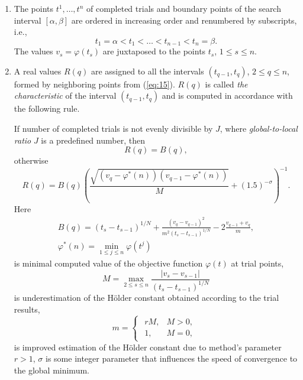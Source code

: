 \documentclass[]{interact}
\theoremstyle{plain}%
\theoremstyle{definition}
\theoremstyle{remark}
\begin{document}
\begin{enumerate}
\item 
The points $t^1, \dots, t^n$ of completed trials and boundary points of the search interval $[\alpha, \beta]$ are ordered in increasing order and renumbered by subscripts, i.e.,
\begin{equation}\label{eq:15}
t_1 = \alpha < t_1 < \dots < t_{n-1} < t_n = \beta.
\end{equation}
The values $v_s = \varphi(t_s)$ are juxtaposed to the points  $t_s$, $1 \leq s \leq n$.
\item 
A real values $R(q)$ are assigned to all the intervals $(t_{q-1}, t_q)$, $2 \leq q \leq n$, formed by neighboring points from (\ref{eq:15}). $R(q)$ is called \textit{the characteristic} of the interval $(t_{q-1}, t_q)$ and is computed in accordance with the following rule.

\textcolor[rgb]{1,0,0}{If number of completed trials is not evenly divisible by $J$, where \textit{global-to-local ratio} $J$ is a predefined number, then }
\begin{equation}\label{eq:16}
R(q) = B(q),
\end{equation}
otherwise
\begin{equation}\label{eq:17}
R(q) = B(q)\left( \frac {\sqrt{(v_q - \varphi^*(n))(v_{q-1} - \varphi^*(n))}}{M} +(1.5)^{-\sigma}\right)^{-1}.
\end{equation}
Here
\begin{gather}\label{eq:18}
B(q) = (t_s - t_{s-1})^{1/N} + \frac{(v_q - v_{q-1})^2} {m^2 (t_s - t_{s-1})^{1/N}} -2\frac{v_{q-1} + v_q}{m},\\
\varphi^*(n) = \min_{1\leq j \leq n} {\varphi(t^j)}
\end{gather}
is minimal computed value of the objective function $\varphi(t)$ at trial points,
\begin{equation}\label{eq:19}
M = \max_{2 \leq  s \leq n} { \frac{|v_s - v_{s-1}|}{(t_s - t_{s-1})^{1/N}} }
\end{equation}
is underestimation of the H{\"o}lder constant obtained according to the trial results,
\begin{equation}\label{eq:20}
m = 
\begin{cases}
\begin{matrix}
rM, & M>0, \\
1, & M= 0,
\end{matrix}
\end{cases}
\end{equation}
is improved estimation of the H{\"o}lder constant due to method's parameter $r>1$, $\sigma$ is some integer parameter that influences the speed of convergence to the global minimum.


\end{enumerate}
\end{document}

